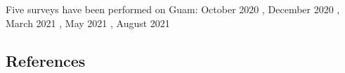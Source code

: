 \documentclass[12pt,letterpaper,english,bibliography=totocnumbered,abstract=on]{scrartcl}
\begin{document}
\begin{refsection}
Five surveys have been performed on Guam: 
October 2020 \cite{mooreCRBDamageWebmap2020}, 
December 2020 \cite{mooreCRBDamageWebmap2020a},
March 2021 \cite{mooreCRBDamageWebmap2021},
May 2021 \cite{mooreCRBDamageWebmap2021a},
August 2021 \cite{mooreCRBDamageWebmap2021b}




\subsection{References}

\printbibliography[heading=none]
\end{refsection}
%
%
%
%
%
%
\end{document}
